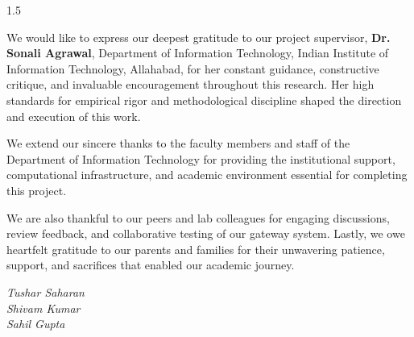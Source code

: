 
\begin{acknowledgements}
\begin{spacing}{1.5}
\addchaptertocentry{\acknowledgementname}

We would like to express our deepest gratitude to our project supervisor, \textbf{Dr. Sonali Agrawal}, Department of Information Technology, Indian Institute of Information Technology, Allahabad, for her constant guidance, constructive critique, and invaluable encouragement throughout this research. Her high standards for empirical rigor and methodological discipline shaped the direction and execution of this work.

We extend our sincere thanks to the faculty members and staff of the Department of Information Technology for providing the institutional support, computational infrastructure, and academic environment essential for completing this project.

We are also thankful to our peers and lab colleagues for engaging discussions, review feedback, and collaborative testing of our gateway system. Lastly, we owe heartfelt gratitude to our parents and families for their unwavering patience, support, and sacrifices that enabled our academic journey.

\vspace{1cm}
\begin{flushright}
\textit{Tushar Saharan}\\
\textit{Shivam Kumar}\\
\textit{Sahil Gupta}
\end{flushright}

\end{spacing}
\end{acknowledgements}


\tableofcontents

\listoffigures

\listoftables


